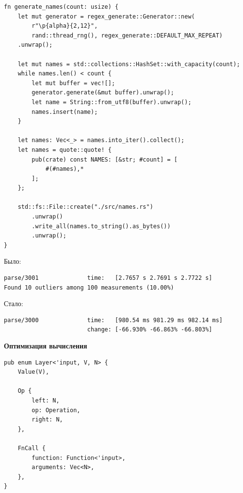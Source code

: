 \begin{frame}[fragile]
    \begin{verbatim}
fn generate_names(count: usize) {
    let mut generator = regex_generate::Generator::new(
        r"\p{alpha}{2,12}",
        rand::thread_rng(), regex_generate::DEFAULT_MAX_REPEAT)
    .unwrap();

    let mut names = std::collections::HashSet::with_capacity(count);
    while names.len() < count {
        let mut buffer = vec![];
        generator.generate(&mut buffer).unwrap();
        let name = String::from_utf8(buffer).unwrap();
        names.insert(name);
    }

    let names: Vec<_> = names.into_iter().collect();
    let names = quote::quote! {
        pub(crate) const NAMES: [&str; #count] = [
            #(#names),*
        ];
    };

    std::fs::File::create("./src/names.rs")
        .unwrap()
        .write_all(names.to_string().as_bytes())
        .unwrap();
}
    \end{verbatim}
\end{frame}

\begin{frame}[fragile]
    Было:
    \begin{lstlisting}[basicstyle=\fontsize{10pt}{12}\bf\ttfamily\color{black}]
parse/3001              time:   [2.7657 s 2.7691 s 2.7722 s]
Found 10 outliers among 100 measurements (10.00%)
    \end{lstlisting}
    \hfill \break
    \hfill \break
    Стало:
    \begin{lstlisting}[basicstyle=\fontsize{10pt}{12}\bf\ttfamily\color{black}]
parse/3000              time:   [980.54 ms 981.29 ms 982.14 ms]
                        change: [-66.930% -66.863% -66.803%]
    \end{lstlisting}
\end{frame}

\begin{frame}[fragile]
  \textbf{Оптимизация вычисления}
\end{frame}

\begin{frame}[fragile]
    \begin{verbatim}
pub enum Layer<'input, V, N> {
    Value(V),

    Op {
        left: N,
        op: Operation,
        right: N,
    },

    FnCall {
        function: Function<'input>,
        arguments: Vec<N>,
    },
}
    \end{verbatim}
\end{frame}

